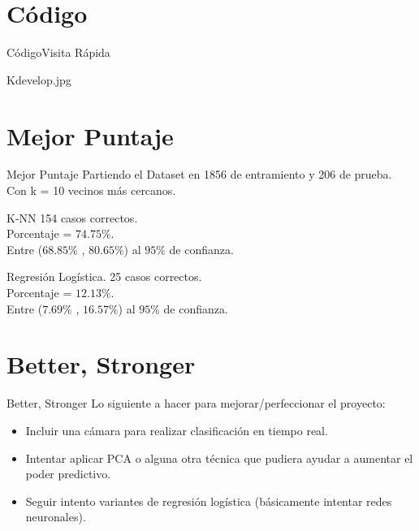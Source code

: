 \documentclass{beamer}
\begin{document}
\begin{darkframes}
    \section{Código}
    \begin{frame}{Código}{Visita Rápida}
     \begin{center}
      Kdevelop.jpg
     \end{center}

    \end{frame}

    \section{Mejor Puntaje}
    \begin{frame}{Mejor Puntaje}
Partiendo el Dataset en 1856 de entramiento y 206 de prueba.\\
Con k = 10 vecinos más cercanos.\\

\begin{block}{K-NN}
        154 casos correctos.\\
        Porcentaje = $74.75\%$.\\
        Entre ($68.85\%$ , $80.65\%$) al $95\%$ de confianza.
    \end{block}
    \pause
    \begin{block}{Regresión Logística.}
        25 casos correctos.\\
        Porcentaje = $12.13\%$.\\
        Entre ($7.69\%$ , $16.57\%$) al $95\%$ de confianza.
    \end{block}
    \end{frame}
    
    \section{Better, Stronger}

\begin{frame}{Better, Stronger}
    Lo siguiente a hacer para mejorar/perfeccionar el proyecto:\pause
    \begin{itemize}
     \item Incluir una cámara para realizar clasificación en tiempo real.\pause
     \item Intentar aplicar PCA o alguna otra técnica que pudiera ayudar a aumentar el poder predictivo.\pause
     \item Seguir intento variantes de regresión logística (básicamente intentar redes neuronales).
    \end{itemize}


\end{frame}
\end{darkframes}
\end{document}
